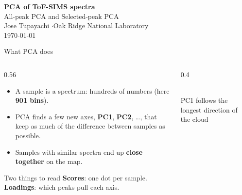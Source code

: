 \documentclass[aspectratio=169,10pt]{beamer}
\newcommand{\hl}[1]{{\color{warm}\bfseries #1}}
\begin{document}
\begin{frame}[plain]
  \vspace{12mm}
  \begin{center}
    {\color{navy}\huge\bfseries PCA of ToF-SIMS spectra}\\[3mm]
    {\color{teal}\Large All-peak PCA and Selected-peak PCA}\\[8mm]
    {\normalsize Jose Tupayachi \quad$\cdot$\quad Oak Ridge National Laboratory}\\[1mm]
    {\color{muted}\small \today}
  \end{center}
\end{frame}

\begin{frame}{What PCA does}
  \begin{columns}[T]
    \begin{column}{0.56\textwidth}
      \begin{itemize}\setlength\itemsep{4mm}\large
        \item A sample is a spectrum: hundreds of numbers (here \hl{901 bins}).
        \item PCA finds a few new axes, \hl{PC1}, \hl{PC2}, \ldots, that keep as much of the difference between samples as possible.
        \item Samples with similar spectra end up \hl{close together} on the map.
      \end{itemize}
      \vspace{3mm}
      \begin{block}{Two things to read}
        \hl{Scores}: one dot per sample.\\
        \hl{Loadings}: which peaks pull each axis.
      \end{block}
    \end{column}
    \begin{column}{0.4\textwidth}
      \begin{center}
      \\[-1mm]
      {\scriptsize PC1 follows the longest direction of the cloud}
      \end{center}
    \end{column}
  \end{columns}
\end{frame}
\end{document}

